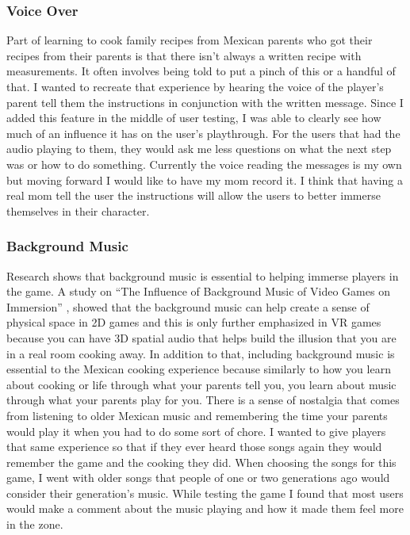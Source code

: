\documentclass[10pt,twocolumn]{article}
\begin{document}
\subsubsection{Voice Over}
Part of learning to cook family recipes from Mexican parents who got their recipes from their parents is that there isn’t always a written recipe with measurements. It often involves being told to put a pinch of this or a handful of that. I wanted to recreate that experience by hearing the voice of the player’s parent tell them the instructions in conjunction with the written message. Since I added this feature in the middle of user testing, I was able to clearly see how much of an influence it has on the user’s playthrough. For the users that had the audio playing to them, they would ask me less questions on what the next step was or how to do something. Currently the voice reading the messages is my own but moving forward I would like to have my mom record it. I think that having a real mom tell the user the instructions will allow the users to better immerse themselves in their character. 

\subsubsection{Background Music}
Research shows that background music is essential to helping immerse players in the game. A study on “The Influence of Background Music of Video Games on Immersion” \cite{backA2015}, showed that the background music can help create a sense of physical space in 2D games and this is only further emphasized in VR games because you can have 3D spatial audio that helps build the illusion that you are in a real room cooking away. In addition to that, including background music is essential to the Mexican cooking experience because similarly to how you learn about cooking or life through what your parents tell you, you learn about music through what your parents play for you. There is a sense of nostalgia that comes from listening to older Mexican music and remembering the time your parents would play it when you had to do some sort of chore. I wanted to give players that same experience so that if they ever heard those songs again they would remember the game and the cooking they did. When choosing the songs for this game, I went with older songs that people of one or two generations ago would consider their generation’s music. While testing the game I found that most users would make a comment about the music playing and how it made them feel more in the zone. 
\end{document}
